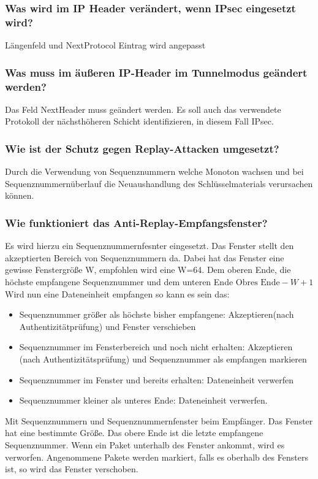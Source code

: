 	\subsubsection{Was wird im IP Header verändert, wenn IPsec eingesetzt wird?}
	Längenfeld und NextProtocol Eintrag wird angepasst %
	\subsubsection{Was muss im äußeren IP-Header im Tunnelmodus geändert werden?}
	Das Feld NextHeader muss geändert werden. Es soll auch das verwendete Protokoll der nächsthöheren Schicht identifizieren, in diesem Fall IPsec.
	
	\subsubsection{Wie ist der Schutz gegen Replay-Attacken umgesetzt?}
	Durch die Verwendung von Sequenznummern welche Monoton wachsen und bei Sequenznummernüberlauf die Neuaushandlung des Schlüsselmaterials verursachen können.
	\subsubsection{Wie funktioniert das Anti-Replay-Empfangsfenster?}
	Es wird hierzu ein Sequenznummernfesnter eingesetzt. Das Fenster stellt den akzeptierten Bereich von Sequenznummern da.  Dabei hat das Fenster eine gewisse Fenstergröße W, empfohlen wird eine W=64. Dem oberen Ende, die höchste empfangene Sequenznummer und dem unteren Ende $\text{Obres Ende} -W +1$
	\newline
	Wird nun eine Dateneinheit empfangen so kann es sein das:
	\begin{itemize}
		\item Sequenznummer größer als höchste bisher empfangene: Akzeptieren(nach Authentizitätprüfung) und Fenster verschieben
		\item Sequenznummer im Fensterbereich und noch nicht erhalten: Akzeptieren (nach Authentizitätsprüfung) und Sequenznummer als empfangen markieren
		\item Sequenznummer im Fenster und bereits erhalten: Dateneinheit verwerfen
		\item Sequenznummer kleiner als unteres Ende: Dateneinheit verwerfen. 
	\end{itemize}
	
	Mit Sequenznummern und Sequenznummernfenster beim Empfänger.
	Das Fenster hat eine bestimmte Größe. Das obere Ende ist die letzte empfangene Sequenznummer. Wenn ein Paket unterhalb des Fenster ankommt, wird es verworfen. Angenommene Pakete werden markiert, falls es oberhalb des Fensters ist, so wird das Fenster verschoben.
